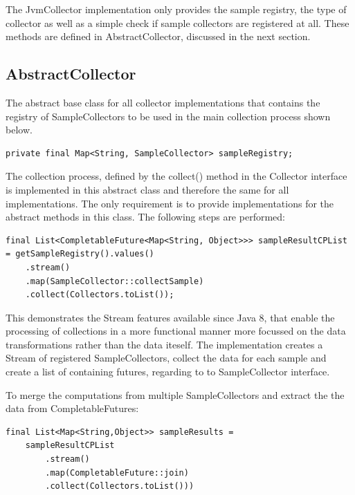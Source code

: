 The JvmCollector implementation only provides the sample registry, the type of collector as well as a simple check if sample collectors
are registered at all. These methods are defined in AbstractCollector, discussed in the next section.

\subsection{AbstractCollector}

The abstract base class for all collector implementations that contains the registry of SampleCollectors to be used in the main
collection process shown below.

\begin{lstlisting}[caption={"AbstractCollector" sample registry}, captionpos=b, label={lst:abstract-collectorsample-registry}]
private final Map<String, SampleCollector> sampleRegistry;
\end{lstlisting}

The collection process, defined by the collect() method in the Collector interface is implemented in this abstract class and
therefore the same for all implementations. The only requirement is to provide implementations for the abstract methods in this class.
The following steps are performed:
\begin{lstlisting}[caption={"AbstractCollector" Fetch sample futures}, captionpos=b, label={lst:abstract-collector-step-one}]
final List<CompletableFuture<Map<String, Object>>> sampleResultCPList = getSampleRegistry().values()
    .stream()
    .map(SampleCollector::collectSample)
    .collect(Collectors.toList());
\end{lstlisting}

This demonstrates the Stream features available since Java 8, that enable the processing of collections in a
more functional manner more focussed on the data transformations rather than the data iteself. The
implementation creates a Stream of registered SampleCollectors, collect the data for each sample and create a list of containing
futures, regarding to to SampleCollector interface.

To merge the computations from multiple SampleCollectors and extract the the data from CompletableFutures:

\begin{lstlisting}[caption={"AbstractCollector" Merge and extract data }, captionpos=b, label={lst:abstract-collector-step-two}]
final List<Map<String,Object>> sampleResults =
    sampleResultCPList
        .stream()
        .map(CompletableFuture::join)
        .collect(Collectors.toList()))
\end{lstlisting}


